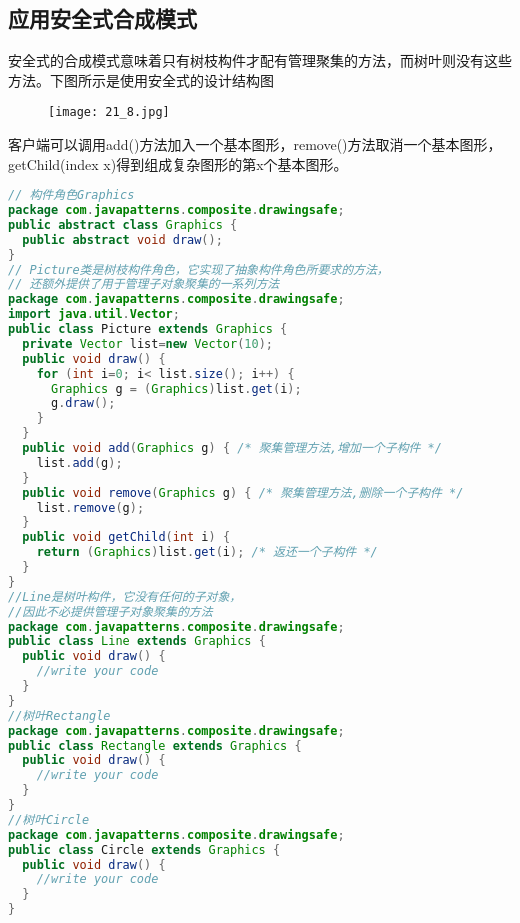 \documentclass[../main.tex]{subfiles}
\begin{document}
\subsection{应用安全式合成模式}
安全式的合成模式意味着只有树枝构件才配有管理聚集的方法，而树叶则没有这些方法。下图所示是使用安全式的设计结构图
\begin{figure}[H]
  \texttt{[image: 21\_8.jpg]}
\end{figure}
%
客户端可以调用add()方法加入一个基本图形，remove()方法取消一个基本图形，getChild(index x)得到组成复杂图形的第x个基本图形。
\begin{lstlisting}[language=java]
// 构件角色Graphics
package com.javapatterns.composite.drawingsafe;
public abstract class Graphics {
  public abstract void draw();
}
// Picture类是树枝构件角色，它实现了抽象构件角色所要求的方法，
// 还额外提供了用于管理子对象聚集的一系列方法
package com.javapatterns.composite.drawingsafe;
import java.util.Vector;
public class Picture extends Graphics {
  private Vector list=new Vector(10);
  public void draw() {
    for (int i=0; i< list.size(); i++) {
      Graphics g = (Graphics)list.get(i);
      g.draw();
    }
  }
  public void add(Graphics g) { /* 聚集管理方法,增加一个子构件 */
    list.add(g);
  }
  public void remove(Graphics g) { /* 聚集管理方法,删除一个子构件 */
    list.remove(g);
  }
  public void getChild(int i) {
    return (Graphics)list.get(i); /* 返还一个子构件 */
  }
}
//Line是树叶构件，它没有任何的子对象，
//因此不必提供管理子对象聚集的方法
package com.javapatterns.composite.drawingsafe;
public class Line extends Graphics {
  public void draw() {
    //write your code
  }
}
//树叶Rectangle
package com.javapatterns.composite.drawingsafe;
public class Rectangle extends Graphics {
  public void draw() {
    //write your code
  }
}
//树叶Circle
package com.javapatterns.composite.drawingsafe;
public class Circle extends Graphics {
  public void draw() {
    //write your code
  }
}
\end{lstlisting}
%
\end{document}
